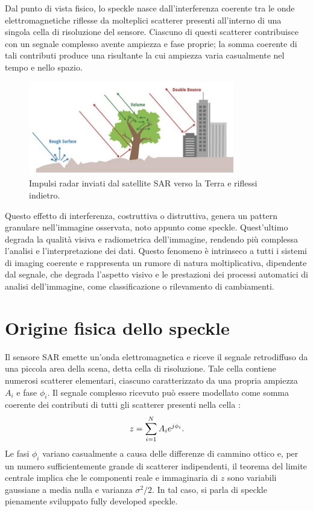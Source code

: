 Dal punto di vista fisico, lo speckle nasce dall’interferenza coerente tra le onde elettromagnetiche riflesse 
da molteplici scatterer presenti all’interno di una singola cella di risoluzione del sensore. 
Ciascuno di questi scatterer contribuisce con un segnale complesso avente ampiezza e fase proprie; 
la somma coerente di tali contributi produce una risultante la cui ampiezza varia casualmente nel tempo e nello spazio.
\begin{figure}[H]
  \centering
  \includegraphics[width=0.8\textwidth]{utils/SARPolarization.jpg}
  \caption{Impulsi radar inviati dal satellite SAR verso la Terra e riflessi indietro.}
  \label{fig:sar_scatter}
\end{figure}  
Questo effetto di interferenza, costruttiva o distruttiva, genera un pattern granulare nell’immagine osservata, 
noto appunto come speckle. Quest'ultimo degrada la qualità visiva e radiometrica dell’immagine, rendendo più complessa l’analisi e l’interpretazione dei dati. 
Questo fenomeno è intrinseco a tutti i sistemi di imaging coerente e rappresenta un rumore di natura moltiplicativa, dipendente dal segnale, che degrada l’aspetto visivo e le prestazioni dei processi automatici di analisi dell’immagine, come classificazione o rilevamento di cambiamenti.
\section{Origine fisica dello speckle}
Il sensore SAR emette un’onda elettromagnetica e riceve il segnale retrodiffuso da una piccola area della scena, detta cella di risoluzione.  
Tale cella contiene numerosi scatterer elementari, ciascuno caratterizzato da una propria ampiezza $A_i$ e fase $\phi_i$.  
Il segnale complesso ricevuto può essere modellato come somma coerente dei contributi di tutti gli scatterer presenti nella cella \cite{6616053}:
\begin{equation}
  \makebox[\textwidth][c]{%
    $\displaystyle
      z = \sum_{i=1}^{N} A_i e^{j \phi_i}.
    $%
  }
\end{equation}
Le fasi $\phi_i$ variano casualmente a causa delle differenze di cammino ottico e, per un numero sufficientemente grande di scatterer indipendenti, il teorema del limite centrale implica che le componenti reale e immaginaria di $z$ sono variabili gaussiane a media nulla e varianza $\sigma^2 / 2$.  
In tal caso, si parla di speckle pienamente sviluppato fully developed speckle.
